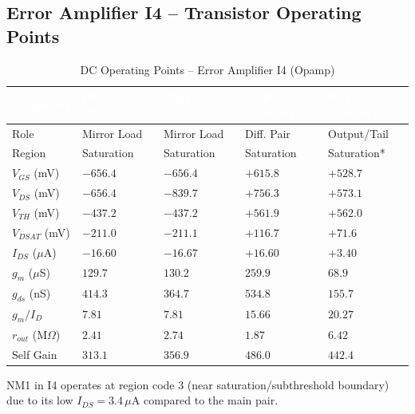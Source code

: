 \documentclass[12pt,a4paper]{article}
\begin{document}
\subsection{Error Amplifier I4 -- Transistor Operating Points}

\begin{table}[H]
  \centering
  \caption{DC Operating Points -- Error Amplifier I4 (Opamp)}
  \renewcommand{\arraystretch}{1.4}
  \begin{tabularx}{\textwidth}{lXXXX}
    \toprule
    \rowcolor{headerblue}
    \textcolor{white}{\textbf{Parameter}}
      & \textcolor{white}{\textbf{PM0 (PMOS)}}
      & \textcolor{white}{\textbf{PM1 (PMOS)}}
      & \textcolor{white}{\textbf{NM0 (NMOS)}}
      & \textcolor{white}{\textbf{NM1 (NMOS)}} \\
    \midrule
    \rowcolor{rowgray}
    Role              & Mirror Load & Mirror Load & Diff. Pair  & Output/Tail \\
    Region            & Saturation  & Saturation  & Saturation  & Saturation* \\
    \rowcolor{rowgray}
    $V_{GS}$ (mV)    & $-656.4$    & $-656.4$    & $+615.8$    & $+528.7$   \\
    $V_{DS}$ (mV)    & $-656.4$    & $-839.7$    & $+756.3$    & $+573.1$   \\
    \rowcolor{rowgray}
    $V_{TH}$ (mV)    & $-437.2$    & $-437.2$    & $+561.9$    & $+562.0$   \\
    $V_{DSAT}$ (mV)  & $-211.0$    & $-211.1$    & $+116.7$    & $+71.6$    \\
    \rowcolor{rowgray}
    $I_{DS}$ ($\mu$A) & $-16.60$  & $-16.67$    & $+16.60$    & $+3.40$    \\
    $g_m$ ($\mu$S)   & $129.7$     & $130.2$     & $259.9$     & $68.9$     \\
    \rowcolor{rowgray}
    $g_{ds}$ (nS)    & $414.3$     & $364.7$     & $534.8$     & $155.7$    \\
    $g_m/I_D$        & $7.81$      & $7.81$      & $15.66$     & $20.27$    \\
    \rowcolor{rowgray}
    $r_{out}$ (M$\Omega$) & $2.41$ & $2.74$   & $1.87$      & $6.42$     \\
    Self Gain         & $313.1$     & $356.9$     & $486.0$     & $442.4$    \\
    \bottomrule
  \end{tabularx}
  \begin{flushleft}
    \small *NM1 in I4 operates at region code 3 (near saturation/subthreshold boundary)
    due to its low $I_{DS} = 3.4\,\mu$A compared to the main pair.
  \end{flushleft}
\end{table}
\end{document}
